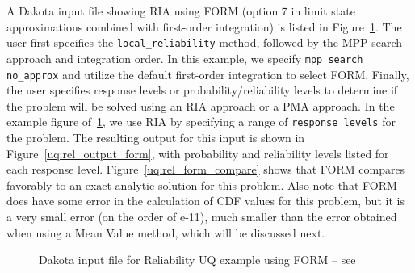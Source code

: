 A Dakota input file showing RIA using FORM (option 7 in limit state
approximations combined with first-order integration) is listed in
Figure~\ref{uq:rel_input_form}.
The user first specifies the \texttt{local\_reliability}
method, followed by the MPP search approach and integration order. In
this example, we specify \texttt{mpp\_search no\_approx} and utilize
the default first-order integration to select FORM. Finally, the user
specifies response levels or probability/reliability levels to
determine if the problem will be solved using an RIA approach or a PMA
approach. In the example figure of~\ref{uq:rel_input_form}, we use
RIA by specifying a range of \texttt{response\_levels} for the
problem. The resulting output for this input is shown in
Figure~\ref{uq:rel_output_form}, with probability and reliability
levels listed for each response level. Figure~\ref{uq:rel_form_compare} 
shows that FORM compares favorably to an exact analytic solution for
this problem. Also note that FORM does have some error in the
calculation of CDF values for this problem, but it is a very small
error (on the order of e-11), much smaller than the error obtained
when using a Mean Value method, which will be discussed next.
\begin{figure}[htbp!]
  \centering
  \begin{bigbox}
    \begin{small}
    \end{small}
  \end{bigbox}
\caption{Dakota input file for Reliability UQ example using FORM --
see \protect{} }
\label{uq:rel_input_form}
\end{figure}

